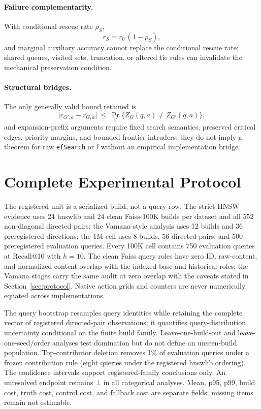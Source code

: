 \documentclass{article}
\renewcommand{\Pr}{\mathop{\mathrm{Pr}}}   %
\newcommand{\BOT}{\bot}
\begin{document}
\paragraph{Failure complementarity.} With conditional rescue rate $\rho_S$,
\begin{equation}
r_{S}=r_{0}\,(1-\rho_{S}),
\label{eq:rescue}
\end{equation}
and marginal auxiliary accuracy cannot replace the conditional rescue rate; shared queues, visited sets,
truncation, or altered tie rules can invalidate the mechanical preservation condition.

\paragraph{Structural bridges.} The only generally valid bound retained is
\begin{equation}
\bigl|r_{G',a}-r_{G,a}\bigr|\ \le\ \Pr_{q}\{Z_{G}(q,a)\neq Z_{G'}(q,a)\},
\label{eq:bridge}
\end{equation}
and expansion-prefix arguments require fixed search semantics, preserved critical edges, priority margins,
and bounded frontier intruders; they do not imply a theorem for raw \texttt{efSearch} or $l$ without an
empirical implementation bridge.

\section{Complete Experimental Protocol}
\label{app:protocol}

The registered unit is a serialized build, not a query row. The strict HNSW evidence uses 24 hnswlib and 24
clean Faiss-100K builds per dataset and all 552 non-diagonal directed pairs; the Vamana-style analysis uses
12 builds and 36 preregistered directions; the 1M cell uses 8 builds, 56 directed pairs, and 500
preregistered evaluation queries. Every 100K cell contains 750 evaluation queries at Recall@10 with $h=10$.
The clean Faiss query roles have zero ID, raw-content, and normalized-content overlap with the indexed base
and historical roles; the Vamana stages carry the same audit at zero overlap with the caveats stated in
Section~\ref{sec:protocol}. Native action grids and counters are never numerically equated across
implementations.

The query bootstrap resamples query identities while retaining the complete vector of registered
directed-pair observations; it quantifies query-distribution uncertainty conditional on the finite build
family. Leave-one-build-out and leave-one-seed/order analyses test domination but do not define an
unseen-build population. Top-contributor deletion removes 1\% of evaluation queries under a frozen
contribution rule (eight queries under the registered hnswlib ordering). The confidence intervals support
registered-family conclusions only. An unresolved endpoint remains $\BOT$ in all categorical analyses.
Mean, p95, p99, build cost, truth cost, control cost, and fallback cost are separate fields; missing items
remain not estimable.
\end{document}
